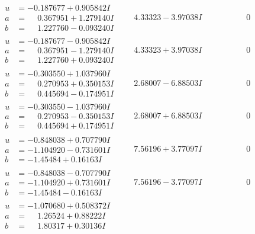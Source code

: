 \documentclass[1p]{elsarticle_modified}
\theoremstyle{definition}
\begin{document}
$$\begin{array}{c|c|c}
\begin{aligned}
u &= -0.187677 + 0.905842 I \\
a &= \phantom{-}0.367951 + 1.279140 I \\
b &= \phantom{-}1.227760 - 0.093240 I\end{aligned}
 & \phantom{-}4.33323 - 3.97038 I & \phantom{-0.000000 } 0 \\ \hline\begin{aligned}
u &= -0.187677 - 0.905842 I \\
a &= \phantom{-}0.367951 - 1.279140 I \\
b &= \phantom{-}1.227760 + 0.093240 I\end{aligned}
 & \phantom{-}4.33323 + 3.97038 I & \phantom{-0.000000 } 0 \\ \hline\begin{aligned}
u &= -0.303550 + 1.037960 I \\
a &= \phantom{-}0.270953 + 0.350153 I \\
b &= \phantom{-}0.445694 - 0.174951 I\end{aligned}
 & \phantom{-}2.68007 - 6.88503 I & \phantom{-0.000000 } 0 \\ \hline\begin{aligned}
u &= -0.303550 - 1.037960 I \\
a &= \phantom{-}0.270953 - 0.350153 I \\
b &= \phantom{-}0.445694 + 0.174951 I\end{aligned}
 & \phantom{-}2.68007 + 6.88503 I & \phantom{-0.000000 } 0 \\ \hline\begin{aligned}
u &= -0.848038 + 0.707790 I \\
a &= -1.104920 - 0.731601 I \\
b &= -1.45484 + 0.16163 I\end{aligned}
 & \phantom{-}7.56196 + 3.77097 I & \phantom{-0.000000 } 0 \\ \hline\begin{aligned}
u &= -0.848038 - 0.707790 I \\
a &= -1.104920 + 0.731601 I \\
b &= -1.45484 - 0.16163 I\end{aligned}
 & \phantom{-}7.56196 - 3.77097 I & \phantom{-0.000000 } 0 \\ \hline\begin{aligned}
u &= -1.070680 + 0.508372 I \\
a &= \phantom{-}1.26524 + 0.88222 I \\
b &= \phantom{-}1.80317 + 0.30136 I\end{aligned}

\end{array}$$
\end{document}
